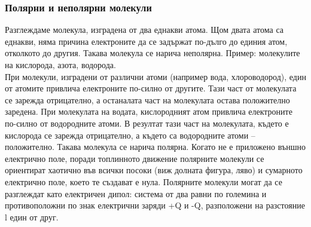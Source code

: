 \documentclass[fleqn, 12pt]{article}
\theoremstyle{definition}
\begin{document}
\subsubsection{Полярни и неполярни молекули}
Разглеждаме молекула, изградена от два еднакви
атома. Щом двата атома са еднакви, няма причина
електроните да се задържат по-дълго до единия атом,
отколкото до другия. Такава молекула се нарича
неполярна. Пример: молекулите на кислорода, азота,
водорода. \\
При молекули, изградени от различни атоми
(например вода, хлороводород), един от атомите
привлича електроните по-силно от другите. Тази част
от молекулата се зарежда отрицателно, а останалата
част на молекулата остава положително заредена. При
молекулата на водата, кислородният
атом привлича електроните по-силно от водородните
атоми. В резултат тази част на молекулата, където е
кислорода се зарежда отрицателно, а където са
водородните атоми – положително. Такава молекула
се нарича полярна. Когато не е приложено външно
електрично поле, поради топлинното движение
полярните молекули се ориентират хаотично във
всички посоки (виж долната фигура, ляво) и
сумарното електрично поле, което те създават е нула. Полярните молекули могат да се
разглеждат като електричен дипол: система от два равни по големина и
противоположни по знак електрични заряди +Q и -Q, разположени на разстояние l един
от друг. 
\end{document}
